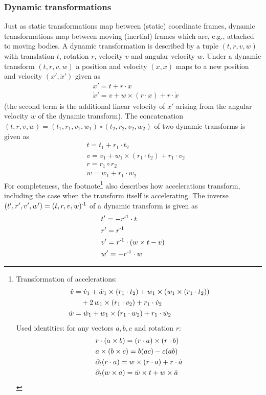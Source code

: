 \subsubsection{Dynamic transformations}

Just as static transformations map between (static) coordinate frames,
dynamic transformations map between moving (inertial) frames which
are, e.g., attached to moving bodies. A dynamic transformation is
described by a tuple $(t,r,v,w)$ with translation $t$, rotation $r$,
velocity $v$ and angular velocity $w$. Under a dynamic transform
$(t,r,v,w)$ a position and velocity $(x,\dot x)$ maps to a new
position and velocity $(x',\dot x')$ given as
\begin{align}
& x'=t + r\cdot x \\
& \dot x' = v + w \times (r\cdot x)+ r\cdot\dot x
\end{align}
(the second term is the additional linear velocity of $\dot x'$
arising from the angular velocity $w$ of the dynamic transform). The
concatenation $(t,r,v,w) = (t_1,r_1,v_1,w_1) \circ (t_2,r_2,v_2,w_2)$
of two dynamic transforms is given as
\begin{align}
& t = t_1 + r_1 \cdot t_2 \\
& v = v_1 + w_1 \times (r_1 \cdot t_2) + r_1 \cdot v_2 \\
& r = r_1 \circ r_2 \\
& w = w_1 + r_1 \cdot w_2
\end{align}
For completeness, the footnote\footnote{Transformation of accelerations:
\begin{align}
\dot v
 &= \dot v_1
      + \dot w_1 \times (r_1 \cdot t_2)
      + w_1 \times (w_1 \times (r_1 \cdot t_2))\nonumber \\
      &\quad+ 2\, w_1 \times (r_1 \cdot v_2)
      + r_1 \cdot \dot v_2 \\
\dot w
 &= \dot w_1 + w_1 \times (r_1 \cdot w_2) + r_1 \cdot \dot w_2
\end{align}
Used identities: for any vectors $a,b,c$ and rotation $r$:
\begin{align}
&r \cdot (a \times b) = (r \cdot a) \times (r \cdot b)\\
& a \times (b \times c) = b (a c) - c (ab) \\
&\partial_t (r \cdot a) = w \times (r \cdot a) + r \cdot \dot a \\
& \partial_t (w \times a) = \dot w \times t + w \times \dot a
\end{align}
} also describes how
accelerations transform, including the case when the transform itself is
accelerating. The inverse $(t',r',v',w') = (t,r,v,w)^{{\hspace*{-.0pt}\text{\rm -}\hspace*{-.5pt}}1}$ of a dynamic
transform is given as
\begin{align}
& t' = -r^{{\hspace*{-.0pt}\text{\rm -}\hspace*{-.5pt}}1} \cdot t \\
& r' =  r^{{\hspace*{-.0pt}\text{\rm -}\hspace*{-.5pt}}1} \\
& v' =  r^{{\hspace*{-.0pt}\text{\rm -}\hspace*{-.5pt}}1} \cdot (w \times t - v) \\
& w' = -r^{{\hspace*{-.0pt}\text{\rm -}\hspace*{-.5pt}}1} \cdot w
\end{align}


